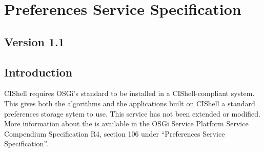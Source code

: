 \chapter{Preferences Service Specification}
\section*{Version 1.1}
\section{Introduction}

CIShell requires OSGi's standard  to be installed in a
CIShell-compliant system. This gives both the algorithms and the applications
built on CIShell a standard preferences storage sytem to use. This service has
not been extended or modified. More information about the
 is available in the OSGi Service Platform Service
Compendium Specification R4, section 106 under ``Preferences Service
Specification''.

